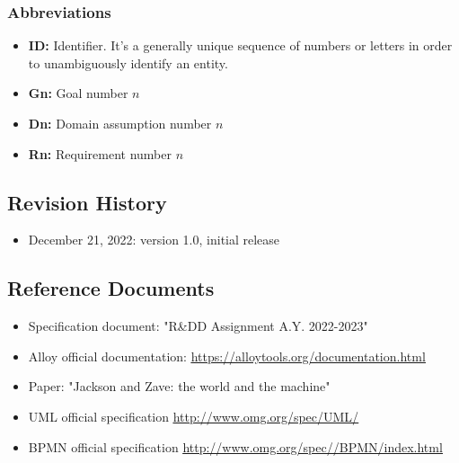 \subsubsection{Abbreviations}
\begin{itemize}
        \item \textbf{ID:} Identifier. It's a generally unique sequence of numbers or letters in order to unambiguously identify an entity.
        \item \textbf{Gn:} Goal number $n$
        \item \textbf{Dn:} Domain assumption number $n$
        \item \textbf{Rn:} Requirement number $n$
\end{itemize}
\subsection{Revision History}
\begin{itemize}
        \item December 21, 2022: version 1.0, initial release
    \end{itemize}
\subsection{Reference Documents}
\begin{itemize}
        \item Specification document: "R\&DD Assignment A.Y. 2022-2023"
        \item Alloy official documentation: \underline{\url{https://alloytools.org/documentation.html}}
        \item Paper: "Jackson and Zave: the world and the machine"
        \item UML official specification \underline{\url{http://www.omg.org/spec/UML/}}
        \item BPMN official specification \underline{\url{http://www.omg.org/spec//BPMN/index.html}}
\end{itemize}
